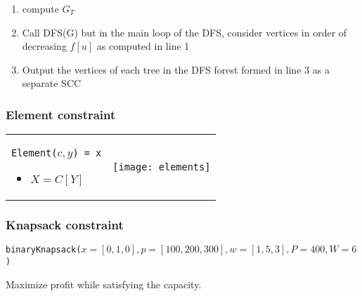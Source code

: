 \begin{enumerate}
\begin{enumerate}
                \begin{tabular}{m{7cm}m{7cm}}
                    \begin{lstlisting}[mathescape]
DFS(V, E):
    // Initialization
    Create global variable Color[1..|V |]
    Create global variable P arent[1..|V |]
    for each node $u \in V$ do
        Color[u] = white
        Parent[u] = Nul
        time = 0

    // Start the search
    for each node $u \in V$ do
        if Color[u] = white then
            Visit(u, V, E)
                \end{lstlisting}
                &
                \begin{lstlisting}[mathescape]
Visit(u, V, E): 
    Color[u] = Grey
    time = time + 1
    d[u] = time

    for $v \in Adj[u]$ do
    // Explore arc (u, v)
        if Color[v] = white then
            Parent[v] = u
            Visit(v, V, E);

    Color[u] = black;
    time = time + 1;
    f[u] = time;
                \end{lstlisting}
                \end{tabular}
            \item compute $G_T$ 
            \item Call DFS(G) but in the main loop of the DFS, consider vertices in order
                of decreasing $f[u]$ as computed in line 1 
            \item Output the vertices of each tree in the DFS forest formed in line 3 as a
                separate SCC
        \end{enumerate}

\end{enumerate}


\subsubsection{Element constraint}

\begin{tabular}{m{6cm}m{6cm}}
    \texttt{Element($c, y$) = x}
    \begin{itemize}
        \item $X = C[Y]$
    \end{itemize}
    &
    \texttt{[image: elements]}
\end{tabular}

\subsubsection{Knapsack constraint}
\begin{center}
    \texttt{binaryKnapsack($x=[0, 1, 0], p=[100, 200, 300], w=[1, 5, 3],
    P=400, W=6$)}
\end{center}
Maximize profit while satisfying the capacity.

